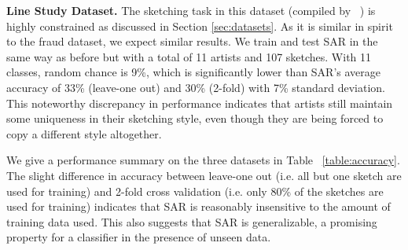 



\noindent\textbf{Line Study Dataset.} The sketching task in this dataset (compiled by ~\cite{Cole:2008:PDL:1360612.1360687}) is highly constrained as discussed in Section \ref{sec:datasets}. As it is similar in spirit to the fraud dataset, we expect similar results. We train and test SAR in the same way as before but with a total of 11 artists and 107 sketches. With 11 classes, random chance is 9\%, which is significantly lower than SAR's average accuracy of 33\% (leave-one out) and 30\% (2-fold) with 7\% standard deviation. This noteworthy discrepancy in performance indicates that artists still maintain some uniqueness in their sketching style, even though they are being forced to copy a different style altogether.

We give a performance summary on the three datasets in Table ~\ref{table:accuracy}. The slight difference in accuracy between leave-one out (i.e. all but one sketch are used for training) and 2-fold cross validation (i.e. only 80\% of the sketches are used for training) indicates that SAR is reasonably insensitive to the amount of training data used. This also suggests that SAR is generalizable, a promising property for a classifier in the presence of unseen data.

